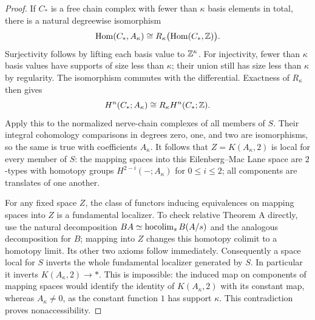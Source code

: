 \begin{proof}
If $C_*$ is a free chain complex with fewer than $\kappa$ basis elements in total, there is a natural degreewise isomorphism
\[
 \operatorname{Hom}(C_*,A_\kappa)
 \cong R_\kappa\bigl(\operatorname{Hom}(C_*,\mathbb Z)\bigr).
\]
Surjectivity follows by lifting each basis value to $\mathbb Z^\kappa$. For injectivity, fewer than $\kappa$ basis values have supports of size less than $\kappa$; their union still has size less than $\kappa$ by regularity. The isomorphism commutes with the differential. Exactness of $R_\kappa$ then gives
\[
 H^n(C_*;A_\kappa)\cong R_\kappa H^n(C_*;\mathbb Z).
\]
Apply this to the normalized nerve-chain complexes of all members of $S$. Their integral cohomology comparisons in degrees zero, one, and two are isomorphisms, so the same is true with coefficients $A_\kappa$. It follows that $Z=K(A_\kappa,2)$ is local for every member of $S$: the mapping spaces into this Eilenberg--Mac Lane space are $2$-types with homotopy groups $H^{2-i}(-;A_\kappa)$ for $0\leq i\leq2$; all components are translates of one another.

For any fixed space $Z$, the class of functors inducing equivalences on mapping spaces into $Z$ is a fundamental localizer. To check relative Theorem A directly, use the natural decomposition $BA\simeq\operatorname*{hocolim}_sB(A/s)$ and the analogous decomposition for $B$; mapping into $Z$ changes this homotopy colimit to a homotopy limit. Its other two axioms follow immediately. Consequently a space local for $S$ inverts the whole fundamental localizer generated by $S$. In particular it inverts $K(A_\kappa,2)\to*$. This is impossible: the induced map on components of mapping spaces would identify the identity of $K(A_\kappa,2)$ with its constant map, whereas $A_\kappa\neq0$, as the constant function $1$ has support $\kappa$. This contradiction proves nonaccessibility.
\end{proof}


